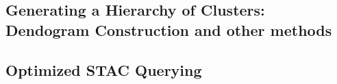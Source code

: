 \begin{multicols}{2}
\subsection{Generating a Hierarchy of Clusters: Dendogram Construction and other methods}

\subsection{Optimized STAC Querying}





\end{multicols}
